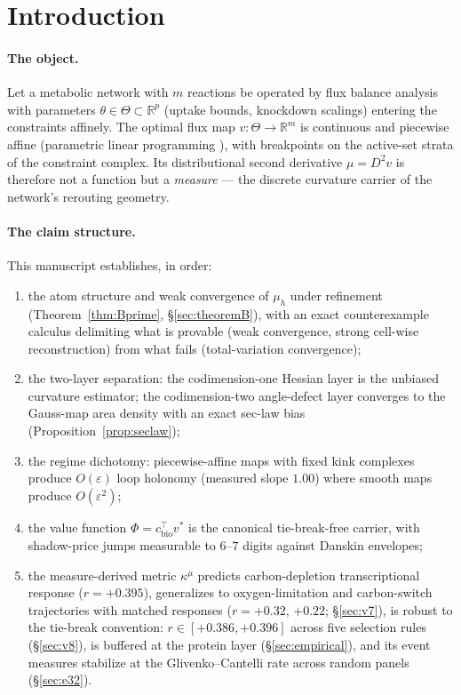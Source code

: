 \documentclass[11pt,a4paper]{article}
\theoremstyle{plain}
\theoremstyle{definition}
\theoremstyle{remark}
\newcommand{\kmu}{\kappa^{\mu}}
\newcommand{\RR}{\mathbb{R}}
\begin{document}
\bigskip

\section{Introduction}\label{sec:intro}


\paragraph{The object.}
Let a metabolic network with $m$ reactions be operated by flux balance
analysis \citep{varma1994, orth2010} with parameters $\theta \in \Theta \subset \RR^p$ (uptake bounds,
knockdown scalings) entering the constraints affinely. The optimal flux map
$v : \Theta \to \RR^m$ is continuous and piecewise affine (parametric
linear programming \citep{borrelli2003}), with breakpoints on the active-set strata of the
constraint complex. Its distributional second derivative
$\mu = D^2 v$ is therefore not a function but a \emph{measure} --- the
discrete curvature carrier of the network's rerouting geometry.

\paragraph{The claim structure.}
This manuscript establishes, in order:
\begin{enumerate}[label=(\roman*)]
\item the atom structure and weak convergence of $\mu_h$
      under refinement (Theorem~\ref{thm:Bprime}, \S\ref{sec:theoremB}), with an exact counterexample calculus delimiting what is provable (weak convergence, strong cell-wise reconstruction) from what fails (total-variation convergence);
\item the two-layer separation: the codimension-one Hessian
      layer is the unbiased curvature estimator; the codimension-two
      angle-defect layer converges to the Gauss-map area density with an
      exact sec-law bias (Proposition~\ref{prop:seclaw});
\item the regime dichotomy: piecewise-affine maps with fixed
      kink complexes produce $O(\varepsilon)$ loop holonomy (measured slope
      $1.00$) where smooth maps produce $O(\varepsilon^2)$;
\item the value function $\Phi = c_{\mathrm{bio}}^\top v^*$
      is the canonical tie-break-free carrier, with shadow-price jumps
      measurable to $6$--$7$ digits against Danskin envelopes;
\item the measure-derived metric $\kmu$ predicts
      carbon-depletion transcriptional response ($r = +0.395$),
      generalizes to oxygen-limitation and carbon-switch trajectories
      with matched responses ($r = +0.32$, $+0.22$; \S\ref{sec:v7}), is
      robust to the tie-break convention: $r \in [+0.386, +0.396]$
      across five selection rules (\S\ref{sec:v8}), is buffered at the
      protein layer
      (\S\ref{sec:empirical}), and its event measures stabilize at
      the Glivenko--Cantelli rate across random panels (\S\ref{sec:e32}).
\end{enumerate}
\end{document}
